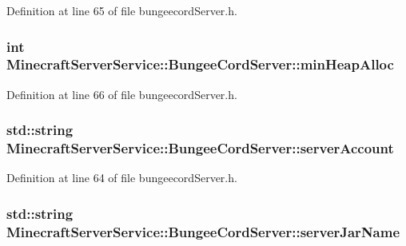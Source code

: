 Definition at line 65 of file bungeecord\+Server.\+h.

\subsubsection[{\texorpdfstring{min\+Heap\+Alloc}{minHeapAlloc}}]{\setlength{\rightskip}{0pt plus 5cm}int Minecraft\+Server\+Service\+::\+Bungee\+Cord\+Server\+::min\+Heap\+Alloc\hspace{0.3cm}{\ttfamily [protected]}}\hypertarget{class_minecraft_server_service_1_1_bungee_cord_server_a9a888b11ba14938f093957e4108bd22b}{}\label{class_minecraft_server_service_1_1_bungee_cord_server_a9a888b11ba14938f093957e4108bd22b}


Definition at line 66 of file bungeecord\+Server.\+h.

\subsubsection[{\texorpdfstring{server\+Account}{serverAccount}}]{\setlength{\rightskip}{0pt plus 5cm}std\+::string Minecraft\+Server\+Service\+::\+Bungee\+Cord\+Server\+::server\+Account\hspace{0.3cm}{\ttfamily [protected]}}\hypertarget{class_minecraft_server_service_1_1_bungee_cord_server_a962f4683af0dcd67eadb62875d926142}{}\label{class_minecraft_server_service_1_1_bungee_cord_server_a962f4683af0dcd67eadb62875d926142}


Definition at line 64 of file bungeecord\+Server.\+h.

\subsubsection[{\texorpdfstring{server\+Jar\+Name}{serverJarName}}]{\setlength{\rightskip}{0pt plus 5cm}std\+::string Minecraft\+Server\+Service\+::\+Bungee\+Cord\+Server\+::server\+Jar\+Name\hspace{0.3cm}{\ttfamily [protected]}}\hypertarget{class_minecraft_server_service_1_1_bungee_cord_server_a68a7e4caf06617af4713dd905ec3ce52}{}\label{class_minecraft_server_service_1_1_bungee_cord_server_a68a7e4caf06617af4713dd905ec3ce52}


